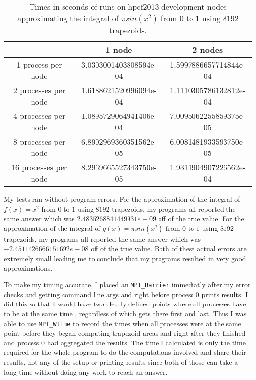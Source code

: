 \documentclass[11pt]{article}
\begin{document}
\begin{table}
\centering
\begin{tabular}{|c|c|c|}
\hline
	& 1 node & 2 nodes  \\ [0.5ex] 
 \hline
 1 process per node & 3.0303001403808594e-04 & 1.5997886657714844e-04   \\ 
 \hline
 2 processes per node & 1.6188621520996094e-04 & 1.1110305786132812e-04   \\
 \hline
4 processes per node & 1.0895729064941406e-04 & 7.0095062255859375e-05   \\
 \hline
8 processes per node & 6.8902969360351562e-05 & 6.0081481933593750e-05   \\
 \hline
16 processes per node & 8.2969665527343750e-05 & 1.9311904907226562e-04   \\ [1ex] 
 \hline
\end{tabular}
\caption{Times in seconds of runs on hpcf2013 development nodes approximating the integral of $\pi sin(x^2)$ from $0$ to $1$ using $8192$ trapezoids.}
\end{table}

My tests ran without program errors. For the approximation of the integral of $f(x)=x^2$ from $0$ to $1$ using $8192$ trapezoids, my programs all reported the same answer which was $2.4835268841449931e-09$ off of the true value. For the approximation of the integral of $g(x)=\pi sin(x^2)$ from $0$ to $1$ using $8192$ trapezoids, my programs all reported the same answer which was $-2.4511426666151692e-08$ off of the true value. Both of these actual errors are extremely small leading me to conclude that my programs resulted in very good approximations.

To make my timing accurate, I placed an \texttt{MPI\_Barrier} immediatly after my error checks and getting command line args and right before process $0$ prints results. I did this so that I would have two clearly defined points where all processes have to be at the same time , regardless of which gets there first and last. Thus I was able to use \texttt{MPI\_Wtime} to record the times when all processes were at the same point before they began computing trapezoid areas and right after they finished and process $0$ had aggregated the results. The time I calculated is only the time required for the whole program to do the computations involved and share their results, not any of the setup or printing results since both of those can take a long time without doing any work to reach an answer.
\end{document}
